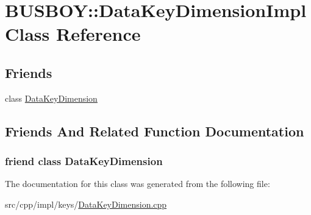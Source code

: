 \hypertarget{classBUSBOY_1_1DataKeyDimensionImpl}{
\section{BUSBOY::DataKeyDimensionImpl Class Reference}
\label{classBUSBOY_1_1DataKeyDimensionImpl}
}
\subsection*{Friends}
\begin{DoxyCompactItemize}
\item 
class \hyperlink{classBUSBOY_1_1DataKeyDimensionImpl_a3d0d7a943b7bcc316fcb4a729aff225f}{DataKeyDimension}
\end{DoxyCompactItemize}


\subsection{Friends And Related Function Documentation}
\hypertarget{classBUSBOY_1_1DataKeyDimensionImpl_a3d0d7a943b7bcc316fcb4a729aff225f}{
\subsubsection[{DataKeyDimension}]{\setlength{\rightskip}{0pt plus 5cm}friend class {\bf DataKeyDimension}}}
\label{classBUSBOY_1_1DataKeyDimensionImpl_a3d0d7a943b7bcc316fcb4a729aff225f}


The documentation for this class was generated from the following file:\begin{DoxyCompactItemize}
\item 
src/cpp/impl/keys/\hyperlink{DataKeyDimension_8cpp}{DataKeyDimension.cpp}\end{DoxyCompactItemize}
